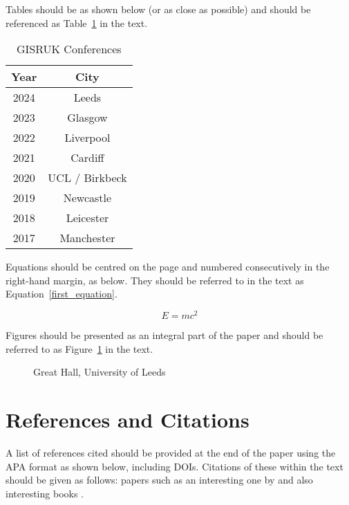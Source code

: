 \documentclass[11pt]{article}
\begin{document}
Tables should be as shown below (or as close as possible) and should be referenced as Table~\ref{first_table} in the text.

\begin{table}[htdp]
\caption{GISRUK Conferences}
\begin{center}
\begin{tabular}{c|c}
\hline 
Year	 & City \\
\hline 
2024 & Leeds \\
2023 & Glasgow \\
2022 & Liverpool \\
2021 & Cardiff \\
2020 & UCL / Birkbeck \\
2019 & Newcastle \\ 
2018 & Leicester \\ 
2017 & Manchester \\
\hline
\end{tabular}
\end{center}
\label{first_table}
\end{table}%

Equations should be centred on the page and numbered consecutively in the right-hand margin, as below. They should be referred to in the text as Equation~\ref{first_equation}. 

\begin{equation}
E=mc^2
\label{first_equation}
\end{equation}

Figures should be presented as an integral part of the paper and should be referred to as Figure~\ref{first_figure} in the text.

\begin{figure}[htbp] \begin{center} 
 \caption{Great Hall, University of Leeds} \label{first_figure} \end{center} \end{figure} %


\section{References and Citations}

A list of references cited should be provided at the end of the paper using the APA format as shown below, including DOIs. Citations of these within the text should be given as follows: papers such as an interesting one by \citet{HARVEY:2006} and also interesting books \citep{DAY:2006}.
\end{document}
